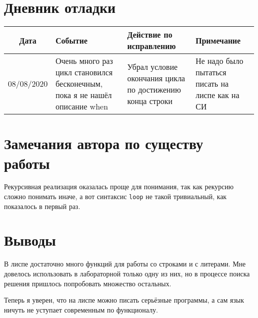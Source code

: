 \documentclass[12pt]{article}
\begin{document}
\section{Дневник отладки}
\noindent
\begin{tabularx}{\linewidth}{|c|X|X|X|}
\hline
Дата & Событие & Действие по исправлению & Примечание \\
\hline
08/08/2020 & 
Очень много раз цикл становился бесконечным, пока я не нашёл описание when &
Убрал условие окончания цикла по достижению конца строки&
Не надо было пытаться писать на лиспе как на СИ\\
\hline
\end{tabularx}

\section{Замечания автора по существу работы}

Рекурсивная реализация оказалась проще для понимания, так как рекурсию сложно понимать иначе,
а вот синтаксис {\tt loop} не такой тривиальный, как показалось в первый раз.

\section{Выводы}

В лиспе достаточно много функций для работы со строками и с литерами.
Мне довелось использовать в лабораторной только одну из них, но в процессе поиска решения
пришлось попробовать множество остальных.

Теперь я уверен, что на лиспе можно писать серьёзные программы, а сам язык ничуть не уступает
современным по функционалу.
\end{document}
